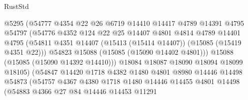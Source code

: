 \begin{lexlean}{RustStd}
\begin{coremodule}
                              @5295
                              (@54777
                                @4354
                                @22
                                @26
                                @6719
                                @14410
                                @14417
                                @4789
                                @14391
                                @4795
                                @54797
                                (@54776
                                  @4352
                                  @124
                                  @22
                                  @25
                                  @14407
                                  @4801
                                  @4814
                                  @4789
                                  @14401
                                  @4795
                                  (@54811
                                    @4351
                                    @14407
                                    (@15413 (@15414 @14407))
                                    (@15085 (@15419 @4351 @22)))
                                  @54823
                                  @15088
                                  (@15085 (@15090 @14402 @4801)))
                                @15088
                                (@15085 (@15090 @14392 @14410)))
                              @18084
                              @18087
                              @18090
                              @18094
                              @18099
                              @18105)
                            (@54847
                              @14420
                              @1718
                              @4382
                              @1480
                              @4801
                              @8980
                              @14446
                              @14498
                              @54873
                              (@54757
                                @4367
                                @4380
                                @1718
                                @1480
                                @14446
                                @14455
                                @4801
                                @14498
                                (@54883
                                  @4366
                                  @27
                                  @84
                                  @14446
                                  @14453
                                  @11291

\end{coremodule}
\end{lexlean}
